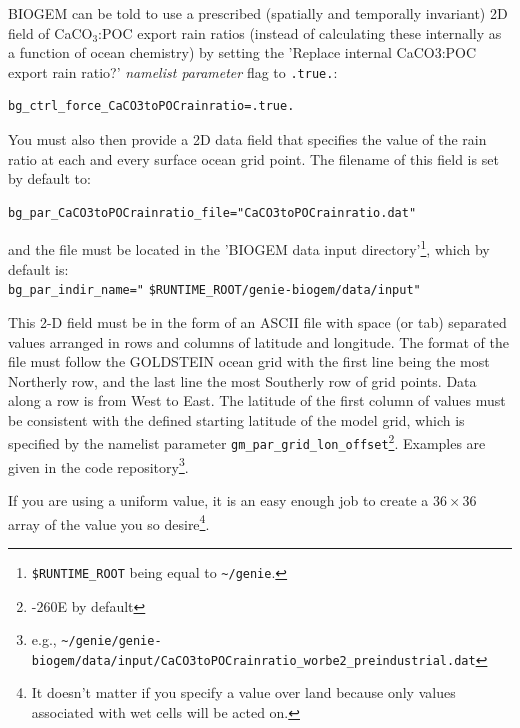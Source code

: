 \documentclass[11pt,fleqn]{book} %
\begin{document}
BIOGEM can be told to use a prescribed (spatially and temporally invariant) 2D field of CaCO\begin{math}_3\end{math}:POC export rain ratios (instead of calculating these internally as a function of ocean chemistry) by setting the 'Replace internal CaCO3:POC export rain ratio?' \textit{namelist parameter} flag to \texttt{.true.}:
\vspace{-2pt}\begin{verbatim}
bg_ctrl_force_CaCO3toPOCrainratio=.true.
\end{verbatim}\vspace{-2pt}
You must also then provide a 2D data field that specifies the value of the rain ratio at each and every surface ocean grid point. The filename of this field is set by default to:
\vspace{-2mm}\begin{verbatim}
bg_par_CaCO3toPOCrainratio_file="CaCO3toPOCrainratio.dat"
\end{verbatim}\vspace{-2mm}
and the file must be located in the 'BIOGEM data input directory'\footnote{\texttt{\$RUNTIME\_ROOT} being equal to \texttt{\~{}/genie}.}, which by default is:
\\\texttt{bg\_par\_indir\_name="} \texttt{\$RUNTIME\_ROOT/genie-biogem/data/input"}

This 2-D field must be in the form of an ASCII file with space (or tab) separated values arranged in rows and columns of latitude and longitude. The format of the file must follow the GOLDSTEIN ocean grid with the first line being the most Northerly row, and the last line the most Southerly row of grid points. Data along a row is from West to East. The latitude of the first column of values must be consistent with the defined starting latitude of the model grid, which is specified by the namelist parameter \texttt{gm\_par\_grid\_lon\_offset}\footnote{-260E by default}. Examples are given in the code repository\footnote{e.g., \texttt{\~{}/genie/genie-biogem/data/input/CaCO3toPOCrainratio\_worbe2\_preindustrial.dat}}.

If you are using a uniform value, it is an easy enough job to create a \begin{math}36\times36\end{math} array of the value you so desire\footnote{It doesn't matter if you specify a value over land because only values associated with wet cells will be acted on.}.
\end{document}
